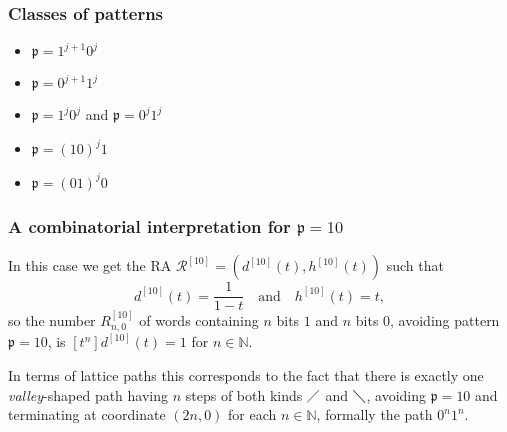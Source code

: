 \documentclass{beamer}
\begin{document}



\begin{frame}\frametitle{Classes of patterns}
\begin{itemize}
    \item $\mathfrak{p}=1^{j+1}0^j$
    \item $\mathfrak{p}=0^{j+1}1^j$
    \item $\mathfrak{p}=1^{j}0^j$ and $\mathfrak{p}=0^{j}1^j$
    \item $\mathfrak{p}=(10)^j1$
    \item $\mathfrak{p}=(01)^j0$
\end{itemize}
\end{frame}

\begin{frame}\frametitle{A combinatorial interpretation for $\mathfrak{p}=10$}

In this case we get the RA ${\mathcal{R}^{[10]}} = \left(d^{[10]}(t), h^{[10]}(t)\right)$ 
such that
\begin{displaymath} 
d^{[10]}(t)=\frac{1}{1-t} \quad \text{and} \quad h^{[10]}(t) = t, 
\end{displaymath} so the number $R_{n, 0}^{[10]}$ of words
containing $n$ bits $1$ and $n$ bits $0$, avoiding pattern $\mathfrak{p}=10$, is
$[t^{n}] d^{[10]}(t) = 1$ for $n\in\mathbb{N}$. 

In terms of lattice paths this corresponds to the fact that there is exactly
one \emph{valley}-shaped path having $n$ steps of both kinds $\diagup$ and
$\diagdown$, avoiding $\mathfrak{p}=10$ and terminating at coordinate $(2n, 0)$
for each $n\in\mathbb{N}$, formally the path $0^{n}1^{n}$.

\end{frame}
\end{document}
